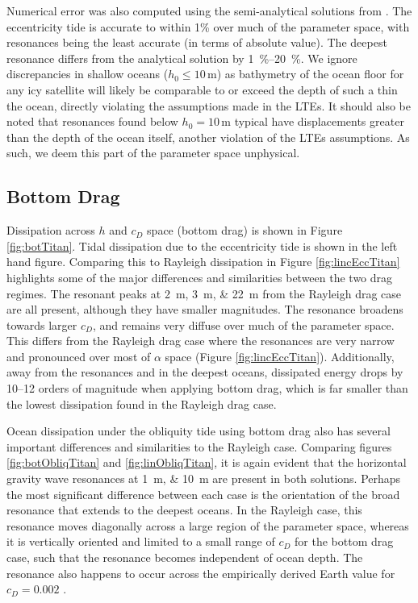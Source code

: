 Numerical error was also computed using the semi-analytical solutions from \citep{matsuyama2014tidal}. The eccentricity tide is accurate to within 1\% over much of the parameter space, with resonances being the least accurate (in terms of absolute value). The deepest resonance differs from the analytical solution by \SIrange{1}{20}{\percent}. We ignore discrepancies in shallow oceans ($h_0 \leq 10 \, \si{\metre}$) as bathymetry of the ocean floor for any icy satellite will likely be comparable to or exceed the depth of such a thin the ocean, directly violating the assumptions made in the LTEs. It should also be noted that resonances found below $h_0 = 10 \, \si{\metre}$ typical have displacements greater than the depth of the ocean itself, another violation of the LTEs assumptions. As such, we deem this part of the parameter space unphysical.

\subsection{Bottom Drag \label{subsec:botTitan}}

Dissipation across $h$ and $c_D$ space (bottom drag) is shown in Figure \ref{fig:botTitan}. Tidal dissipation due to the eccentricity tide is shown in the left hand figure. Comparing this to Rayleigh dissipation in Figure \ref{fig:lincEccTitan} highlights some of the major differences and similarities between the two drag regimes. The resonant peaks at \SIlist{2;3;22}{\metre} from the Rayleigh drag case are all present, although they have smaller magnitudes. The resonance broadens towards larger $c_D$, and remains very diffuse over much of the parameter space. This differs from the Rayleigh drag case where the resonances are very narrow and pronounced over most of $\alpha$ space (Figure \ref{fig:lincEccTitan}). Additionally, away from the resonances and in the deepest oceans, dissipated energy drops by \numrange{10}{12} orders of magnitude when applying bottom drag, which is far smaller than the lowest dissipation found in the Rayleigh drag case.  

Ocean dissipation under the obliquity tide using bottom drag also has several important differences and similarities to the Rayleigh case. Comparing figures \ref{fig:botObliqTitan} and \ref{fig:linObliqTitan}, it is again evident that the horizontal gravity wave resonances at \SIlist{1;10}{\metre} are present in both solutions. Perhaps the most significant difference between each case is the orientation of the broad resonance that extends to the deepest oceans. In the Rayleigh case, this resonance moves diagonally across a large region of the parameter space, whereas it is vertically oriented and limited to a small range of $c_D$ for the bottom drag case, such that the resonance becomes independent of ocean depth. The resonance also happens to occur across the empirically derived Earth value for $c_D = 0.002$ \citep[e.g.,][]{sohl1995tidal,egbert2001estimates}. %


